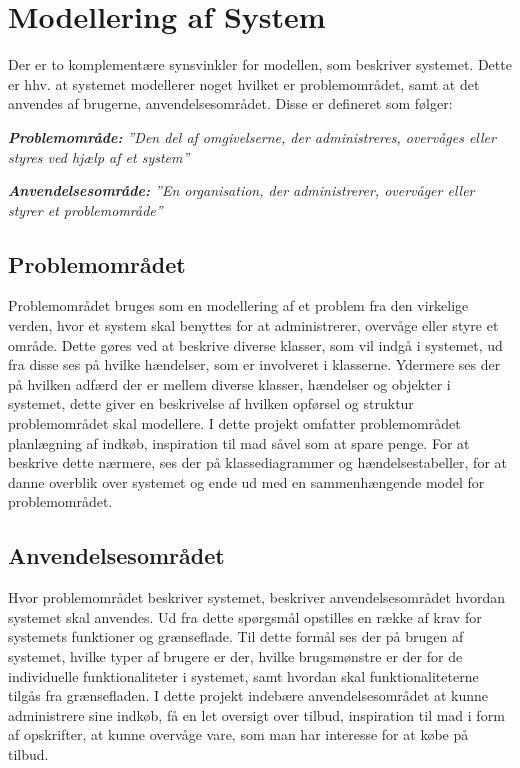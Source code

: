 \section{Modellering af System}
Der er to komplementære synsvinkler for modellen, som beskriver systemet. 
Dette er hhv. at systemet modellerer noget hvilket er problemområdet, samt at det anvendes af brugerne, anvendelsesområdet. 
Disse er defineret som følger:

\textit{\textbf{Problemområde:} ''Den del af omgivelserne, der administreres, overvåges eller styres ved hjælp af et system''}

\textit{\textbf{Anvendelsesområde:} ''En organisation, der administrerer, overvåger eller styrer et problemområde''}\citep{OOA&D2001}
\subsection{Problemområdet}
Problemområdet bruges som en modellering af et problem fra den virkelige verden, hvor et system skal benyttes for at administrerer, overvåge eller styre et område. 
Dette gøres ved at beskrive diverse klasser, som vil indgå i systemet, ud fra disse ses på hvilke hændelser, som er involveret i klasserne.
Ydermere ses der på hvilken adfærd der er mellem diverse klasser, hændelser og objekter i systemet, dette giver en beskrivelse af hvilken opførsel og struktur problemområdet skal modellere.
I dette projekt omfatter problemområdet planlægning af indkøb, inspiration til mad såvel som at spare penge.
For at beskrive dette nærmere, ses der på klassediagrammer og hændelsestabeller, for at danne overblik over systemet og ende ud med en sammenhængende model for problemområdet.
\subsection{Anvendelsesområdet}
Hvor problemområdet beskriver systemet, beskriver anvendelsesområdet hvordan systemet skal anvendes.
Ud fra dette spørgsmål opstilles en række af krav for systemets funktioner og grænseflade.
Til dette formål ses der på brugen af systemet, hvilke typer af brugere er der, hvilke brugsmønstre er der for de individuelle funktionaliteter i systemet, samt hvordan skal funktionaliteterne tilgås fra grænsefladen.
I dette projekt indebære anvendelsesområdet at kunne administrere sine indkøb, få en let oversigt over tilbud, inspiration til mad i form af opskrifter, at kunne overvåge vare, som man har interesse for at købe på tilbud.

